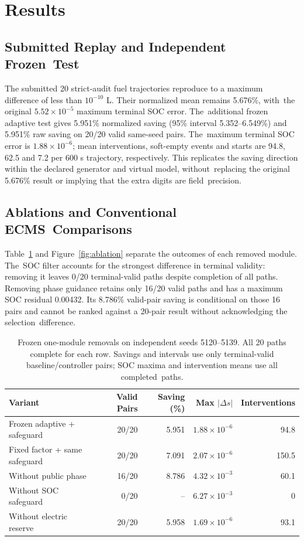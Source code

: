 \documentclass[energies,article,submit,moreauthors]{Definitions/mdpi}
\begin{document}
\section{Results}
\unskip
\subsection{Submitted Replay and Independent Frozen~Test}
The submitted 20 strict-audit fuel trajectories reproduce to a maximum difference of less than $10^{-10}$ L. Their normalized mean remains 5.676\%, with~the original $5.52\times10^{-5}$ maximum terminal SOC error. The~additional frozen adaptive test gives 5.951\% normalized saving (95\% interval 5.352--6.549\%) and 5.951\% raw saving on 20/20 valid same-seed pairs. The~maximum terminal SOC error is $1.88\times10^{-6}$; mean interventions, soft-empty events and starts are 94.8, 62.5 and 7.2 per 600 s trajectory, respectively. This replicates the saving direction within the declared generator and virtual model, without~replacing the original 5.676\% result or implying that the extra digits are field~precision.

\subsection{Ablations and Conventional ECMS~Comparisons}
Table~\ref{tab:ablation} and Figure~\ref{fig:ablation} separate the outcomes of each removed module. The~SOC filter accounts for the strongest difference in terminal validity: removing it leaves 0/20 terminal-valid paths despite completion of all paths. Removing phase guidance retains only 16/20 valid paths and has a maximum SOC residual 0.00432. Its 8.786\% valid-pair saving is conditional on those 16 pairs and cannot be ranked against a 20-pair result without acknowledging the selection~difference.

\begin{table}[H]
\caption{Frozen one-module removals on independent seeds 5120--5139. All 20 paths complete for each row. Savings and intervals use only terminal-valid baseline/controller pairs; SOC maxima and intervention means use all completed~paths.}\label{tab:ablation}
\small\begin{tabularx}{\linewidth}{@{}Xrrrr@{}}\toprule
\textbf{Variant} & \textbf{Valid Pairs} & \textbf{Saving (\%)} & \textbf{Max \boldmath$|\Delta s|$} & \textbf{Interventions} \\\midrule
Frozen adaptive + safeguard & 20/20 & 5.951 & $1.88\times10^{-6}$ & 94.8 \\
Fixed factor + same safeguard & 20/20 & 7.091 & $2.07\times10^{-6}$ & 150.5 \\
Without public phase & 16/20 & 8.786 & $4.32\times10^{-3}$ & 60.1 \\
Without SOC safeguard & 0/20 & -- & $6.27\times10^{-3}$ & 0 \\
Without electric reserve & 20/20 & 5.958 & $1.69\times10^{-6}$ & 93.1 \\\bottomrule
\end{tabularx}
\end{table}
\end{document}
